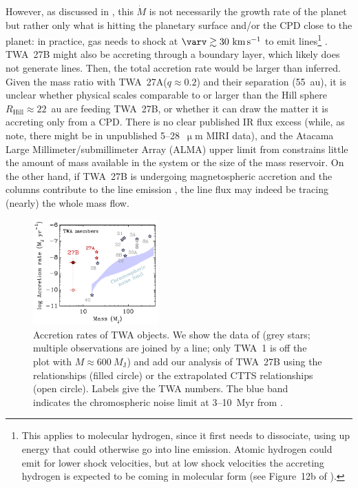 \documentclass[twocolumn,twocolumnappendix]{aastex631}
\def\mum{\ensuremath{\upmu\mathrm{m}}\xspace}
\newcommand{\neuI}[1]{{\leavevmode{\boldmath\bfseries#1}}}
\renewcommand{\neuI}[1]{{\leavevmode#1}}
\def\MJ{\ensuremath{M_{\textrm{J}}}\xspace}        %
\def\MPkt{\ensuremath{\dot{M}}\xspace}                               %
\newcommand{\RH}{\ensuremath{{R_{\textrm{Hill}}}}\xspace}       %
\def\kms{\ensuremath{\textrm{km}\,\textrm{s}^{-1}}\xspace}    %
\def\twa{TWA~27A\xspace}
\def\twb{TWA~27B\xspace}
\begin{document}
However, as discussed in \citet{m22Schock}, this \MPkt is not necessarily the growth rate of the planet but rather only what is hitting the planetary surface and/or the CPD close to the planet: in practice, gas needs to shock at $\varv\gtrsim30~\kms$ to emit lines\footnote{This applies to molecular hydrogen, since it first needs to dissociate, using up energy that could otherwise go into line emission. Atomic hydrogen could emit for lower shock velocities, but at low shock velocities the accreting hydrogen is expected to be coming in molecular form (see Figure~12b of \citealt{Aoyama+2020}).} \citep{aoyama18}. \twb might also be accreting through a boundary layer, which \neuI{likely} does not generate lines. Then, the total accretion rate would be larger than inferred. Given the mass ratio with \twa ($q\approx0.2$) and their separation (55~au), it is unclear whether physical scales comparable to or larger than the Hill sphere $\RH\approx22$~au are feeding \twb, or whether it can draw the matter it is accreting only from a CPD. There is no clear \neuI{published} IR flux excess \neuI{(while, as \citealt{luhman23c} note, there might be in unpublished 5--28~\mum MIRI data)},
%
%
%
%
%
%
%
%
%
%
%
%
%
%
%
%
%
%
%
%
%
%
%
%
%
%
%
and the Atacama Large Millimeter/submillimeter Array (ALMA) upper limit from \citet{ricci17} constrains little the amount of mass available in the system or the size of the mass reservoir.
%
On the other hand, if \twb is undergoing magnetospheric accretion and the columns contribute to the line emission \citep{hartmann16}, the line flux may indeed be tracing \neuI{(nearly)} the whole mass flow.


\begin{figure}[t]
 \centering
 \includegraphics[width=0.43\textwidth]{Marina_MPkt.pdf}
\caption{%
Accretion rates of TWA objects.
We show the data of \citet{venuti19} (grey stars; multiple observations are joined by a line; only TWA~1 is off the plot with $M\approx600~\MJ$)
and add our analysis of \twb
using the \citet{AMIM21L} relationships (filled circle)
or the extrapolated CTTS relationships (open circle).
Labels give the TWA numbers.
The blue band indicates the chromospheric noise limit at 3--10~Myr from \citet{venuti19}.
}
\label{fig:MPkt}
\end{figure}
\end{document}

